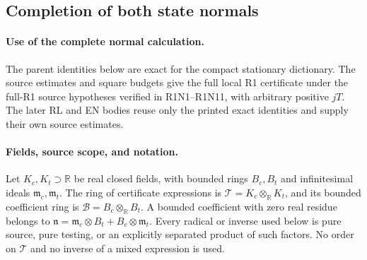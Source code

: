 \subsection{Completion of both state normals}
\label{component:p261f71af685d}

\label{p261f71af685d:sec:fn-reconstructed}

\paragraph{Use of the complete normal calculation.}
The parent identities below are exact for the compact stationary dictionary.
The source estimates and square budgets give the full local R1 certificate
under the full-R1 source hypotheses verified in R1N1--R1N11, with arbitrary
positive $jT$. The later RL and EN bodies reuse only the printed exact
identities and supply their own source estimates.

\paragraph{Fields, source scope, and notation.}
Let $K_c,K_t\supset\mathbb R$ be real closed fields, with bounded rings
$B_c,B_t$ and infinitesimal ideals $\mathfrak m_c,\mathfrak m_t$.
The ring of certificate expressions is
$\mathcal T=K_c\otimes_{\mathbb R}K_t$, and its bounded coefficient ring
is $\mathcal B=B_c\otimes_{\mathbb R}B_t$.  A bounded coefficient with
zero real residue belongs to
$\mathfrak n=\mathfrak m_c\otimes B_t+B_c\otimes\mathfrak m_t$.
Every radical or inverse used below is pure source, pure testing, or
an explicitly separated product of such factors.  No order on
$\mathcal T$ and no inverse of a mixed expression is used.

